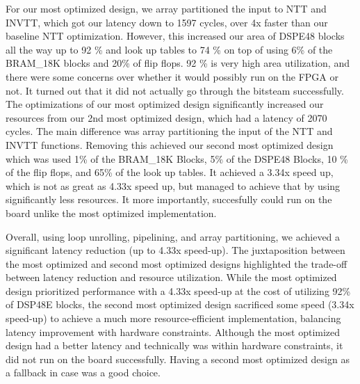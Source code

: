   For our most optimized design, we array partitioned the input to NTT and INVTT, which got our latency down to 1597 cycles,
over 4x faster than our baseline NTT optimization. However, this increased our area of DSPE48 blocks all the way up to 92 \% 
and look up tables to 74 \% on top of using 6\% of the BRAM\_18K blocks and 20\% of flip flops. 92 \% is very high area 
utilization, and there were some concerns over whether it would possibly run on the FPGA or not. It turned out that it did not actually 
go through the bitsteam successfully. The optimizations of our most optimized design significantly increased our resources from our 
2nd most optimized design, which had a latency of 2070 cycles. The main difference was array partitioning the input of the NTT and 
INVTT functions. Removing this achieved our second most optimized design which was used 1\% of the BRAM\_18K Blocks, 5\% of the DSPE48 
Blocks, 10 \% of the flip flops, and  65\% of the look up tables. It achieved a 3.34x speed up, which is not as great as 4.33x speed up,
but managed to achieve that by using significantly less resources. It more importantly, succesfully could run on the board unlike the most
optimized implementation.

  Overall, using loop unrolling, pipelining, and array partitioning, we achieved a significant latency reduction (up to 4.33x speed-up).
The juxtaposition between the most optimized and second most optimized designs highlighted the trade-off between latency reduction and
resource utilization. While the most optimized design prioritized performance with a 4.33x speed-up at the cost of utilizing 92\% of DSP48E
blocks, the second most optimized design sacrificed some speed (3.34x speed-up) to achieve a much more resource-efficient implementation, 
balancing latency improvement with hardware constraints. Although the most optimized design had a better latency and technically was within 
hardware constraints, it did not run on the board successfully. Having a second most optimized design as a fallback in case was a good choice.











